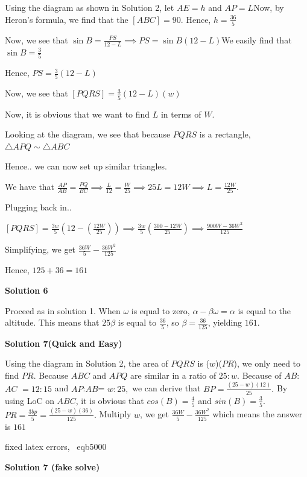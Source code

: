 \begin{enumerate}
Using the diagram as shown in Solution 2, let $AE=h$ and $AP=L$Now, by Heron's formula, we find that the $[ABC]=90$. Hence, $h=\frac{36}{5}$

 Now, we see that $\sin{B}=\frac{PS}{12-L}\implies PS=\sin{B}(12-L)$We easily find that $\sin{B}=\frac{3}{5}$ 

 Hence, $PS=\frac{3}{5}(12-L)$

 Now, we see that $[PQRS]=\frac{3}{5}(12-L)(w)$

 Now, it is obvious that we want to find $L$ in terms of $W$.

 Looking at the diagram, we see that because $PQRS$ is a rectangle, $\triangle{APQ}\sim{\triangle{ABC}}$

 Hence.. we can now set up similar triangles.

 We have that $\frac{AP}{AB}=\frac{PQ}{BC}\implies \frac{L}{12}=\frac{W}{25}\implies 25L=12W\implies L=\frac{12W}{25}$.

 Plugging back in..

 
$[PQRS]=\frac{3w}{5}(12-(\frac{12W}{25}))\implies \frac{3w}{5}(\frac{300-12W}{25})\implies \frac{900W-36W^2}{125}$

 Simplifying, we get $\frac{36W}{5}-\frac{36W^2}{125}$

 Hence, $125+36=\boxed{161}$




\textbf{Solution 6}

Proceed as in solution 1. When $\omega$ is equal to zero, $\alpha - \beta\omega=\alpha$ is equal to the altitude. This means that $25\beta$ is equal to $\frac{36}{5}$, so $\beta = \frac{36}{125}$, yielding $\boxed{161}$.

 



\textbf{Solution 7(Quick and Easy)}

Using the diagram in Solution 2, the area of $PQRS$ is ($w$)($PR$), we only need to find $PR$. Because $ABC$ and $APQ$ are similar in a ratio of $25:w.$ Because of $AB$:$AC$ $=12:15$ and $AP$:$AB$= $w:25,$ we can derive that $BP=\frac{(25-w)(12)}{25}.$ By using LoC on $ABC$, it is obvious that $cos(B)=\frac{4}{5}$ and $sin(B)=\frac{3}{5}.$ $PR=\frac{3bp}{5}=\frac{(25-w)(36)}{125}.$ Multiply $w$, we get $\frac{36W}{5}-\frac{36W^2}{125}$ which means the answer is  $\boxed{161}$

 fixed latex errors, ~eqb5000

 



\textbf{Solution 7 (fake solve)}


\end{enumerate}
